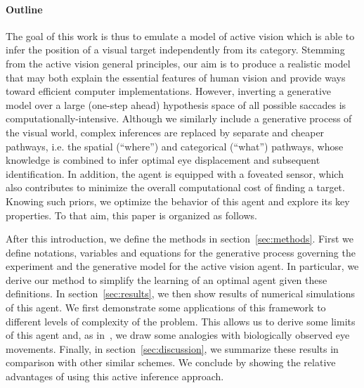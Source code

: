 \paragraph{Outline}
The goal of this work is thus to emulate a model of active vision which is able to infer the position of a visual target independently from its category.
Stemming from the active vision general principles, our aim is to produce a realistic model that may both explain the essential features of human vision and provide ways toward efficient computer implementations.
However, inverting a generative model over a large (one-step ahead) hypothesis space of all possible saccades is computationally-intensive. %
Although we similarly include a generative process of the visual world, complex inferences are replaced by separate and cheaper pathways, i.e. the spatial (``where'') and categorical (``what'') pathways, whose knowledge is combined to infer optimal eye displacement and subsequent identification.    
In addition,  the agent is equipped with a foveated sensor, %
which also contributes to minimize the overall computational cost of finding a target. Knowing such priors, we optimize the behavior of this agent and explore its key properties.
To that aim, this paper is organized as follows.

After this introduction, we define the methods in section~\ref{sec:methods}. First we  define notations, variables and equations for the generative process governing the experiment and the generative model for the active vision agent. In particular, we  derive our method to simplify the learning of an optimal agent given these definitions. In section~\ref{sec:results}, we  then show results of numerical simulations of this agent. We  first demonstrate some applications of this framework to different levels of complexity of the problem. This  allows us to derive some limits of this agent and, as in~\citep{Najemnik05}, we  draw some analogies with biologically observed eye movements. Finally, in section~\ref{sec:discussion}, we  summarize these results in comparison with other similar schemes. We  conclude by showing the relative advantages of using this active inference approach.
